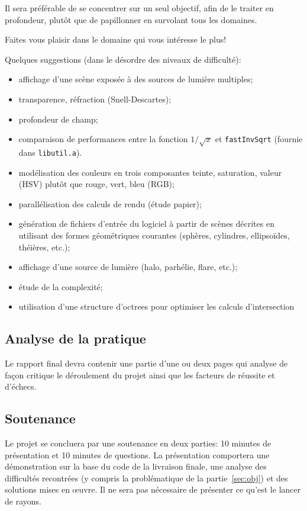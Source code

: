 \documentclass[10pt, a4paper ]{article}
\begin{document}
Il sera préférable de se concentrer sur un seul objectif, afin de le traiter en
profondeur, plutôt que de papillonner en survolant tous les domaines.

Faites vous plaisir dans le domaine qui vous intéresse le plus!

Quelques suggestions (dans le désordre des niveaux de difficulté):
\begin{itemize}
    \item affichage d'une scène exposée à des sources de lumière multiples;
    \item transparence, réfraction (Snell-Descartes);
    \item profondeur de champ;
    \item comparaison de performances entre la fonction $1/\sqrt{x}$ et
        \texttt{fastInvSqrt} (fournie dans \texttt{libutil.a}).
    \item modélisation des couleurs en trois composantes
        teinte, saturation, valeur (HSV) plutôt que rouge, vert, bleu (RGB);
    \item parallélisation des calculs de rendu (étude papier);
    \item génération de fichiers d'entrée du logiciel à partir de scènes
        décrites en utilisant des formes géométriques courantes (sphères,
        cylindres, ellipsoïdes, théières, etc.);
    \item affichage d'une source de lumière (halo, parhélie, flare,  etc.);
    \item étude de la complexité;
    \item utilisation d'une structure d'octrees pour optimiser les calculs
        d'intersection
\end{itemize}

\subsection{Analyse de la pratique }

Le rapport final devra contenir une partie d'une ou deux pages qui analyse de
façon critique le déroulement du projet ainsi que les facteurs de réussite et
d'échecs.

\subsection{Soutenance }

Le projet se concluera par une soutenance en deux parties: 10 minutes de
présentation et 10 minutes de questions. La présentation comportera une
démonstration sur la base du code de la livraison finale, une analyse des
difficultés recontrées (y compris la problématique de la partie~\ref{sec:obj})
et des solutions mises en œuvre. Il ne sera pas nécessaire de présenter ce
qu'est le lancer de rayons.
\end{document}
